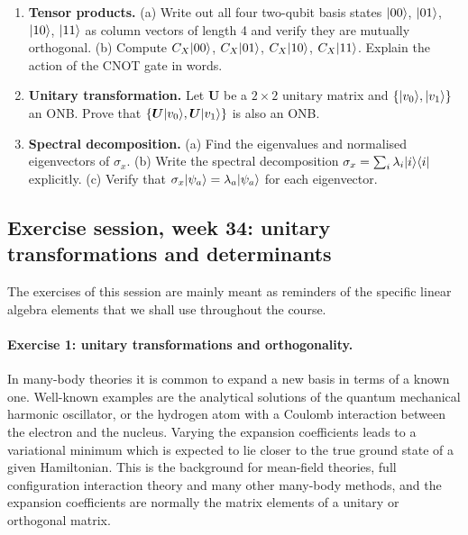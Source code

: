 \begin{enumerate}
\item \textbf{Tensor products.}
  (a) Write out all four two-qubit basis states $\vert 00 \rangle$,
      $\vert 01 \rangle$, $\vert 10 \rangle$, $\vert 11 \rangle$ as column vectors of
      length 4 and verify they are mutually orthogonal.
  (b) Compute $C_X\vert 00 \rangle$, $C_X\vert 01 \rangle$, $C_X\vert 10 \rangle$,
      $C_X\vert 11 \rangle$.  Explain the action of the CNOT gate in words.

\item \textbf{Unitary transformation.}
  Let $\bm{U}$ be a $2\times 2$ unitary matrix and
  $\{\vert v_0 \rangle,\vert v_1 \rangle\}$ an ONB.  Prove that
  $\{\bm{U}\vert v_0 \rangle,\bm{U}\vert v_1 \rangle\}$ is also an ONB.

\item \textbf{Spectral decomposition.}
  (a) Find the eigenvalues and normalised eigenvectors of $\sigma_x$.
  (b) Write the spectral decomposition $\sigma_x=\sum_i\lambda_i\vert i \rangle\langle i \vert$
      explicitly.
  (c) Verify that $\sigma_x\vert \psi_a \rangle=\lambda_a\vert \psi_a \rangle$ for
      each eigenvector.

\end{enumerate}

\subsection*{Exercise session, week 34: unitary transformations and determinants}

The exercises of this session are mainly meant as reminders of the specific
linear algebra elements that we shall use throughout the course.

\paragraph{Exercise 1: unitary transformations and orthogonality.}
In many-body theories it is common to expand a new basis in terms of a known
one.  Well-known examples are the analytical solutions of the quantum
mechanical harmonic oscillator, or the hydrogen atom with a Coulomb
interaction between the electron and the nucleus.  Varying the expansion
coefficients leads to a variational minimum which is expected to lie closer to
the true ground state of a given Hamiltonian.  This is the background for
mean-field theories, full configuration interaction theory and many other
many-body methods, and the expansion coefficients are normally the matrix
elements of a unitary or orthogonal matrix.

